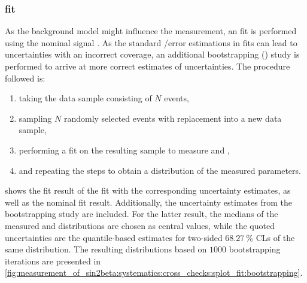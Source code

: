 \subsubsection{\sPlot fit}
\label{sec:measurement_of_sin2beta:systematics:cross_checks:splot_fit}
%
As the background model might influence the measurement, an \sPlot fit is
performed using the nominal signal \PDF. As the standard \Minuit/\Hesse error
estimations in \sPlot fits can lead to uncertainties with an incorrect coverage,
an additional bootstrapping (\cf \eg \cite{Behnke:2013pga}) study is performed
to arrive at more correct estimates of uncertainties. The procedure followed is:
%
\begin{enumerate}
  \item taking the \sweighted data sample consisting of $N$ events,
  \item sampling $N$ randomly selected events with replacement into a new data sample,
  \item performing a fit on the resulting sample to measure \SJpsiKS and \CJpsiKS,
  \item and repeating the steps to obtain a distribution of the measured \CP parameters.
\end{enumerate}
%
shows the fit result of the \sPlot fit with the corresponding \Hesse uncertainty
estimates, as well as the nominal fit result. Additionally, the uncertainty
estimates from the bootstrapping study are included. For the latter result, the
medians of the measured \SJpsiKS and \CJpsiKS distributions are chosen as
central values, while the quoted uncertainties are the quantile-based estimates
for two-sided $\SI{68.27}{\percent}$ \acp{CL} of the same distribution. The
resulting distributions based on $\num{1000}$ bootstrapping iterations are
presented in
\cref{fig:measurement_of_sin2beta:systematics:cross_checks:splot_fit:bootstrapping}.

